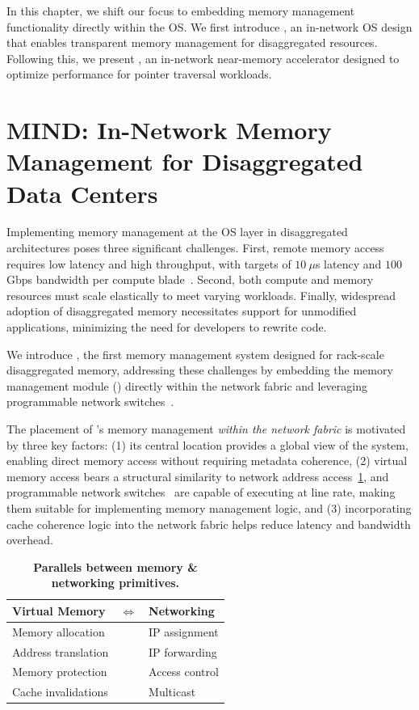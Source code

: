 In this chapter, we shift our focus to embedding memory management functionality directly within the OS. We first introduce \mind, an in-network OS design that enables transparent memory management for disaggregated resources. Following this, we present \pulse, an in-network near-memory accelerator designed to optimize performance for pointer traversal workloads.


\section{MIND: In-Network Memory Management for Disaggregated Data Centers}
\label{sec:mindbackground}




Implementing memory management at the OS layer in disaggregated architectures poses three significant challenges. First, remote memory access requires low latency and high throughput, with targets of $10~\mu$s latency and $100$ Gbps bandwidth per compute blade~\cite{legoos, infiniswap, fastswap, disagg}. Second, both compute and memory resources must scale elastically to meet varying workloads. Finally, widespread adoption of disaggregated memory necessitates support for unmodified applications, minimizing the need for developers to rewrite code.

We introduce \mind, the first memory management system designed for rack-scale disaggregated memory, addressing these challenges by embedding the memory management module (\mmm) directly within the network fabric and leveraging programmable network switches~\cite{progswitch1, progswitch2}.

The placement of \mind's memory management \textit{within the network fabric} is motivated by three key factors: (1) its central location provides a global view of the system, enabling direct memory access without requiring metadata coherence, (2) virtual memory access bears a structural similarity to network address access~\ref{table:isomorph}, and programmable network switches~\cite{progswitch1} are capable of executing at line rate, making them suitable for implementing memory management logic, and (3) incorporating cache coherence logic into the network fabric helps reduce latency and bandwidth overhead.

\begin{table}
    \caption[Parallels between memory \& networking primitives]{\small \textbf{Parallels between memory \& networking primitives.}}
    \label{table:isomorph}
    \centering
    \scriptsize
    \renewcommand{\arraystretch}{1.2}
    \begin{tabular}{p{3cm} p{1cm}p{3cm}}
      \hline
      \textbf{Virtual Memory} &$\Longleftrightarrow$ &\textbf{Networking} \\\hline\hline
      Memory allocation&&IP assignment\\
      Address translation &&IP forwarding\\
      Memory protection  &&Access control\\
      Cache invalidations &&Multicast\\
      \hline
    \end{tabular}
\end{table}


